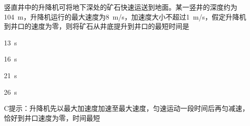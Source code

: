 竖直井中的升降机可将地下深处的矿石快速运送到地面。某一竖井的深度约为\qty{104}{m}，升降机运行的最大速度为\qty{8}{m/s}，加速度大小不超过\qty{1}{m/s}，假定升降机到井口的速度为零，则将矿石从井底提升到井口的最短时间是\paren[C]
\begin{choices}
    \item \qty{13}{s}
    \item \qty{16}{s}
    \item \qty{21}{s}
    \item \qty{26}{s}
\end{choices}
\begin{answer}
    C\qquad 提示：升降机先以最大加速度加速至最大速度，匀速运动一段时间后再匀减速，恰好到井口速度为零，时间最短
\end{answer}